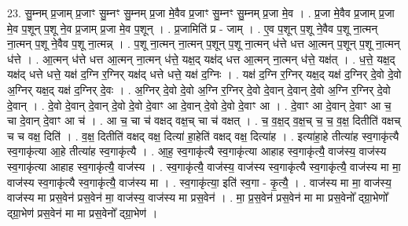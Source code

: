\documentclass[17pt]{extarticle}
\begin{document}
23. सु॒म्नम् प्र॒जाम् प्र॒जाꣳ सु॒म्नꣳ सु॒म्नम् प्र॒जा मे॒वैव प्र॒जाꣳ सु॒म्नꣳ सु॒म्नम् प्र॒जा मे॒व । . प्र॒जा मे॒वैव प्र॒जाम् प्र॒जा मे॒व प॒शून् प॒शू ने॒व प्र॒जाम् प्र॒जा मे॒व प॒शून् । . प्र॒जामिति॑ प्र - जाम् । . ए॒व प॒शून् प॒शू ने॒वैव प॒शू ना॒त्मन् ना॒त्मन् प॒शू ने॒वैव प॒शू ना॒त्मन्न् । . प॒शू ना॒त्मन् ना॒त्मन् प॒शून् प॒शू ना॒त्मन् ध॑त्ते धत्त आ॒त्मन् प॒शून् प॒शू ना॒त्मन् ध॑त्ते । . आ॒त्मन् ध॑त्ते धत्त आ॒त्मन् ना॒त्मन् ध॑त्ते॒ यक्ष॒द् यक्ष॑द् धत्त आ॒त्मन् ना॒त्मन् ध॑त्ते॒ यक्ष॑त् । . ध॒त्ते॒ यक्ष॒द् यक्ष॑द् धत्ते धत्ते॒ यक्ष॑ द॒ग्नि र॒ग्निर् यक्ष॑द् धत्ते धत्ते॒ यक्ष॑ द॒ग्निः । . यक्ष॑ द॒ग्नि र॒ग्निर् यक्ष॒द् यक्ष॑ द॒ग्निर् दे॒वो दे॒वो अ॒ग्निर् यक्ष॒द् यक्ष॑ द॒ग्निर् दे॒वः । . अ॒ग्निर् दे॒वो दे॒वो अ॒ग्नि र॒ग्निर् दे॒वो दे॒वान् दे॒वान् दे॒वो अ॒ग्नि र॒ग्निर् दे॒वो दे॒वान् । . दे॒वो दे॒वान् दे॒वान् दे॒वो दे॒वो दे॒वाꣳ आ दे॒वान् दे॒वो दे॒वो दे॒वाꣳ आ । . दे॒वाꣳ आ दे॒वान् दे॒वाꣳ आ च॒ चा दे॒वान् दे॒वाꣳ आ च॑ । . आ च॒ चा च॑ वक्षद् वक्ष॒च् चा च॑ वक्षत् । . च॒ व॒क्ष॒द् व॒क्ष॒च् च॒ च॒ व॒क्ष॒ दितीति॑ वक्षच् च च वक्ष॒ दिति॑ । . व॒क्ष॒ दितीति॑ वक्षद् वक्ष॒ दित्या॑ हा॒हेति॑ वक्षद् वक्ष॒ दित्या॑ह । . इत्या॑हा॒हे तीत्या॑ह स्व॒गाकृ॑त्यै स्व॒गाकृ॑त्या आ॒हे तीत्या॑ह स्व॒गाकृ॑त्यै । . आ॒ह॒ स्व॒गाकृ॑त्यै स्व॒गाकृ॑त्या आहाह स्व॒गाकृ॑त्यै॒ वाज॑स्य॒ वाज॑स्य स्व॒गाकृ॑त्या आहाह स्व॒गाकृ॑त्यै॒ वाज॑स्य । . स्व॒गाकृ॑त्यै॒ वाज॑स्य॒ वाज॑स्य स्व॒गाकृ॑त्यै स्व॒गाकृ॑त्यै॒ वाज॑स्य मा मा॒ वाज॑स्य स्व॒गाकृ॑त्यै स्व॒गाकृ॑त्यै॒ वाज॑स्य मा । . स्व॒गाकृ॑त्या॒ इति॑ स्व॒गा - कृ॒त्यै॒ । . वाज॑स्य मा मा॒ वाज॑स्य॒ वाज॑स्य मा प्रस॒वेन॑ प्रस॒वेन॑ मा॒ वाज॑स्य॒ वाज॑स्य मा प्रस॒वेन॑ । . मा॒ प्र॒स॒वेन॑ प्रस॒वेन॑ मा मा प्रस॒वेनो᳚ द्ग्रा॒भेणो᳚ द्ग्रा॒भेण॑ प्रस॒वेन॑ मा मा प्रस॒वेनो᳚ द्ग्रा॒भेण॑ । \newline
\end{document}
